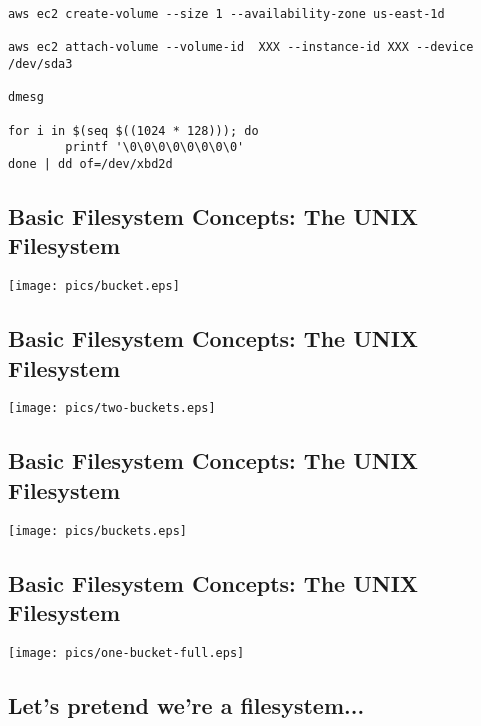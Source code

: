 \documentclass[xga]{xdvislides}
\begin{document}
\begin{verbatim}
aws ec2 create-volume --size 1 --availability-zone us-east-1d

aws ec2 attach-volume --volume-id  XXX --instance-id XXX --device /dev/sda3

dmesg

for i in $(seq $((1024 * 128))); do
        printf '\0\0\0\0\0\0\0\0'
done | dd of=/dev/xbd2d
\end{verbatim}

\subsection{Basic Filesystem Concepts: The UNIX Filesystem}
\vspace*{\fill}
\begin{center}
\texttt{[image: pics/bucket.eps]} \\
\end{center}
\vspace*{\fill}

\subsection{Basic Filesystem Concepts: The UNIX Filesystem}
\begin{center}
\texttt{[image: pics/two-buckets.eps]} \\
\end{center}

\subsection{Basic Filesystem Concepts: The UNIX Filesystem}
\vspace*{\fill}
\begin{center}
\texttt{[image: pics/buckets.eps]} \\
\end{center}
\vspace*{\fill}

\subsection{Basic Filesystem Concepts: The UNIX Filesystem}
\begin{center}
\texttt{[image: pics/one-bucket-full.eps]} \\
\end{center}

\subsection{Let's pretend we're a filesystem...}
\end{document}
